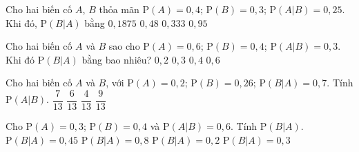 

\begin{ex}%
	Cho hai biến cố $A$, $B$ thỏa mãn  $\mathrm{P}\left(A\right)=0{,}4$; $\mathrm{P} \left(B\right)=0{,}3$; $\mathrm{P}\left(A|B\right)=0{,}25$. Khi đó, $\mathrm{P}\left(B|A\right)$ bằng
	\choice 
		 {\True $0{,}1875$}
		{$0{,}48$} 
		{$0{,}333$} 
		{$0{,}95$} 
\end{ex}

\begin{ex}%
	Cho hai biến cố $A$ và $B$ sao cho $\mathrm{P}\left(A\right)=0{,}6$; $\mathrm{P}\left(B\right)=0{,}4$; $\mathrm{P}\left(A|B\right)=0{,}3$. Khi đó $\mathrm{P}\left(B|A\right)$ bằng bao  nhiêu?
	\choice 
		 {\True $0{,}2$}
		 {$0{,}3$}
		 {$0{,}4$}
		 {$0{,}6$}
\end{ex}

\begin{ex}%
	Cho hai biến cố  $A$ và $B$, với $\mathrm{P} \left(A\right)=0{,}2$; $\mathrm{P} \left(B\right)=0{,}26$; $\mathrm{P}\left(B|A\right)=0{,}7$. Tính $\mathrm{P}\left(A|B\right)$.
	 \choice
		 {\True $\dfrac{7}{13}$}
		{$\dfrac{6}{13}$} 
		 {$\dfrac{4}{13}$}
		{$\dfrac{9}{13}$} 
\end{ex}

\begin{ex}%
	Cho $\mathrm{P}(A)=0{,}3$; $\mathrm{P}(B)=0{,}4$  và $\mathrm{P}(A|B)=0{,}6$. Tính $\mathrm{P}(B|A)$.
	 \choice
		{$\mathrm{P}(B|A)=0{,}45$} 
		{\True  $\mathrm{P}(B|A)=0{,}8$}
		{$\mathrm{P}(B|A)=0{,}2$} 
		{$\mathrm{P}(B|A)=0{,}3$} 
\end{ex}

